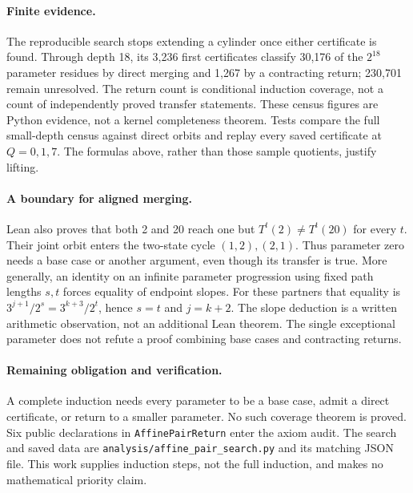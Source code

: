 \documentclass[10pt]{article}
\begin{document}
\paragraph{Finite evidence.}
The reproducible search stops extending a cylinder once either certificate
is found. Through depth 18, its 3,236 first certificates classify 30,176
of the $2^{18}$ parameter residues by direct merging and 1,267 by a
contracting return; 230,701 remain unresolved. The return count is
conditional induction coverage, not a count of independently proved
transfer statements. These census figures are Python evidence, not a
kernel completeness theorem. Tests compare the full small-depth census
against direct orbits and replay every saved certificate at $Q=0,1,7$.
The formulas above, rather than those sample quotients, justify lifting.

\paragraph{A boundary for aligned merging.}
Lean also proves that both 2 and 20 reach one but $T^t(2)\ne T^t(20)$
for every $t$. Their joint orbit enters the two-state cycle $(1,2),(2,1)$.
Thus parameter zero needs a base case or another argument, even though
its transfer is true. More generally, an identity on an infinite parameter
progression using fixed path lengths $s,t$ forces equality of endpoint
slopes. For these partners that equality is
$3^{j+1}/2^s=3^{k+3}/2^t$, hence $s=t$ and $j=k+2$.
The slope deduction is a written arithmetic observation, not an additional
Lean theorem. The single exceptional parameter does not refute a proof
combining base cases and contracting returns.

\paragraph{Remaining obligation and verification.}
A complete induction needs every parameter to be a base case, admit a
direct certificate, or return to a smaller parameter. No such coverage
theorem is proved. Six public declarations in \texttt{AffinePairReturn}
enter the axiom audit. The search and saved data are
\texttt{analysis/affine\_pair\_search.py} and its matching JSON file.
This work supplies induction steps, not the full induction, and makes
no mathematical priority claim.
\end{document}
